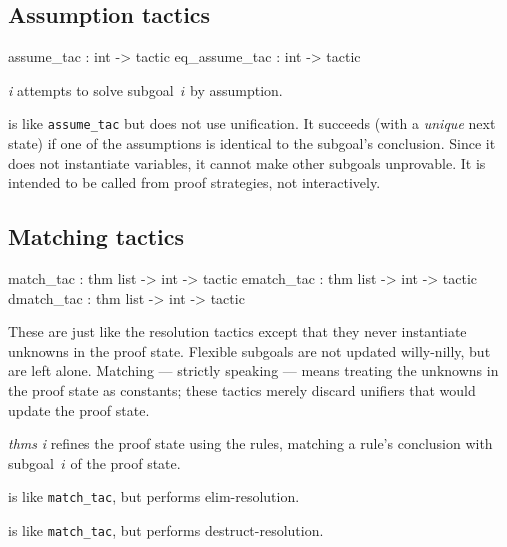 \subsection{Assumption tactics}
\begin{ttbox} 
assume_tac    : int -> tactic
eq_assume_tac : int -> tactic
\end{ttbox} 
\begin{ttdescription}
\item[\ttindexbold{assume_tac} {\it i}] 
attempts to solve subgoal~$i$ by assumption.

\item[\ttindexbold{eq_assume_tac}] 
is like {\tt assume_tac} but does not use unification.  It succeeds (with a
{\em unique\/} next state) if one of the assumptions is identical to the
subgoal's conclusion.  Since it does not instantiate variables, it cannot
make other subgoals unprovable.  It is intended to be called from proof
strategies, not interactively.
\end{ttdescription}

\subsection{Matching tactics} \label{match_tac}
\begin{ttbox} 
match_tac  : thm list -> int -> tactic
ematch_tac : thm list -> int -> tactic
dmatch_tac : thm list -> int -> tactic
\end{ttbox}
These are just like the resolution tactics except that they never
instantiate unknowns in the proof state.  Flexible subgoals are not updated
willy-nilly, but are left alone.  Matching --- strictly speaking --- means
treating the unknowns in the proof state as constants; these tactics merely
discard unifiers that would update the proof state.
\begin{ttdescription}
\item[\ttindexbold{match_tac} {\it thms} {\it i}] 
refines the proof state using the rules, matching a rule's
conclusion with subgoal~$i$ of the proof state.

\item[\ttindexbold{ematch_tac}] 
is like {\tt match_tac}, but performs elim-resolution.

\item[\ttindexbold{dmatch_tac}] 
is like {\tt match_tac}, but performs destruct-resolution.
\end{ttdescription}


